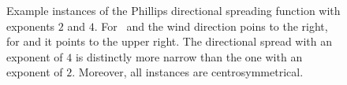 \begin{figure}
{ }
 \hfill
 \hfill
\caption{Example instances of the Phillips directional spreading function with 
exponents $2$ and $4$. For~ and
 the wind direction poins to 
the right, for  and
 it points to the upper right. 
The directional spread with an exponent of $4$ is distinctly more narrow 
than the one with an exponent of $2$. Moreover, all instances are
centrosymmetrical.}
\label{fig:phillips_directional_term}
\end{figure}
